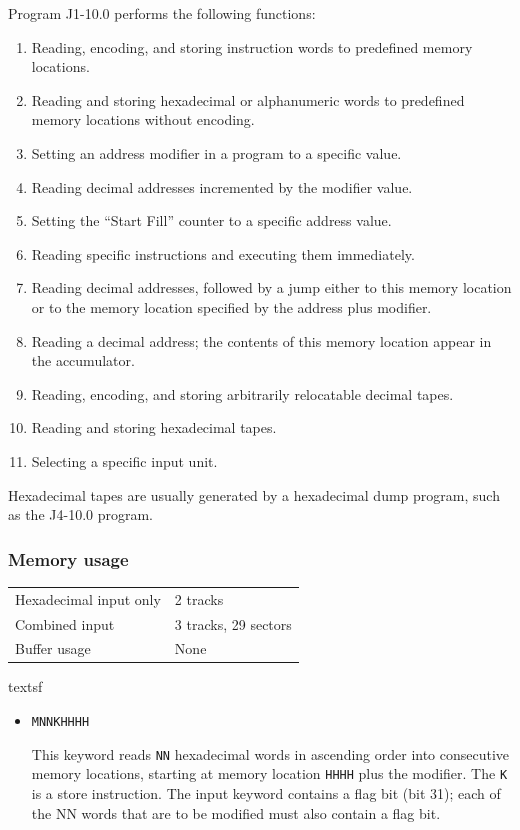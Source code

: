 \documentclass{article}
\begin{document}
\begin{enumerate}
Program J1-10.0 performs the following functions:
\begin{enumerate}
\item Reading, encoding, and storing instruction words to predefined memory locations.
\item Reading and storing hexadecimal or alphanumeric words to predefined memory locations without encoding.
\item Setting an address modifier in a program to a specific value.
\item Reading decimal addresses incremented by the modifier value.
\item Setting the ``Start Fill'' counter to a specific address value.
\item Reading specific instructions and executing them immediately. 
\item Reading decimal addresses, followed by a jump either to this memory location or to the memory location specified by the address plus modifier.
\item Reading a decimal address; the contents of this memory location appear in the accumulator.
\item Reading, encoding, and storing arbitrarily relocatable decimal tapes.
\item Reading and storing hexadecimal tapes.
\item Selecting a specific input unit.
\end{enumerate}
Hexadecimal tapes are usually generated by a hexadecimal dump program, such as the J4-10.0 program.

\subsubsection*{Memory usage}
\begin{center}
\begin{tabular}{ll}
    \toprule
    Hexadecimal input only & 2 tracks \\
    Combined input & 3 tracks, 29 sectors \\
    Buffer usage & None \\
    \bottomrule
\end{tabular}
\end{center}textsf

\begin{itemize}
\item \texttt{MNNKHHHH}

This keyword reads \texttt{NN} hexadecimal words in ascending order into consecutive memory locations, starting at memory location \texttt{HHHH} plus the modifier. The \texttt{K} is a store instruction. The input keyword contains a flag bit (bit 31); 
each of the NN words that are to be modified must also contain a flag bit.


\end{itemize}
\end{enumerate}
\end{document}
